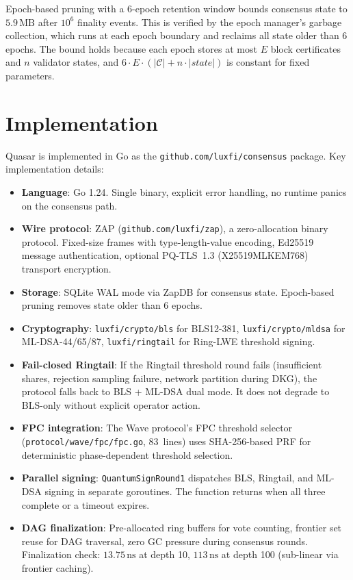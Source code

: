 \documentclass[11pt,a4paper]{article}
\begin{document}
Epoch-based pruning with a 6-epoch retention window bounds consensus state to
$5.9\,\text{MB}$ after $10^6$ finality events. This is verified by the
epoch manager's garbage collection, which runs at each epoch boundary and
reclaims all state older than 6 epochs. The bound holds because each epoch
stores at most $E$ block certificates and $n$ validator states, and
$6 \cdot E \cdot (|\mathcal{C}| + n \cdot |\mathit{state}|)$ is constant
for fixed parameters.


\section{Implementation}
\label{sec:implementation}

Quasar is implemented in Go as the \texttt{github.com/luxfi/consensus}
package. Key implementation details:

\begin{itemize}[leftmargin=2em]
\item \textbf{Language}: Go 1.24. Single binary, explicit error handling,
      no runtime panics on the consensus path.
\item \textbf{Wire protocol}: ZAP (\texttt{github.com/luxfi/zap}), a
      zero-allocation binary protocol. Fixed-size frames with type-length-value
      encoding, Ed25519 message authentication, optional PQ-TLS~1.3
      (X25519MLKEM768) transport encryption.
\item \textbf{Storage}: SQLite WAL mode via ZapDB for consensus state.
      Epoch-based pruning removes state older than 6 epochs.
\item \textbf{Cryptography}: \texttt{luxfi/crypto/bls} for BLS12-381,
      \texttt{luxfi/crypto/mldsa} for ML-DSA-44/65/87,
      \texttt{luxfi/ringtail} for Ring-LWE threshold signing.
\item \textbf{Fail-closed Ringtail}: If the Ringtail threshold round fails
      (insufficient shares, rejection sampling failure, network partition
      during DKG), the protocol falls back to BLS + ML-DSA dual mode.
      It does not degrade to BLS-only without explicit operator action.
\item \textbf{FPC integration}: The Wave protocol's FPC threshold selector
      (\texttt{protocol/wave/fpc/fpc.go}, 83~lines) uses SHA-256-based PRF
      for deterministic phase-dependent threshold selection.
\item \textbf{Parallel signing}: \texttt{QuantumSignRound1} dispatches BLS,
      Ringtail, and ML-DSA signing in separate goroutines. The function
      returns when all three complete or a timeout expires.
\item \textbf{DAG finalization}: Pre-allocated ring buffers for vote counting,
      frontier set reuse for DAG traversal, zero GC pressure during consensus
      rounds. Finalization check: $13.75\,\text{ns}$ at depth 10,
      $113\,\text{ns}$ at depth 100 (sub-linear via frontier caching).
\end{itemize}
\end{document}
